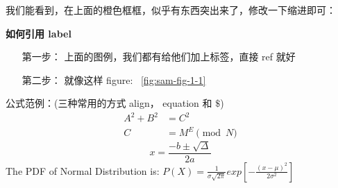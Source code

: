 \documentclass[11pt]{article}
\theoremstyle{definition}
\begin{document}
我们能看到，在上面的橙色框框，似乎有东西突出来了，修改一下缩进即可：
\begin{shaded}
\textbf{如何引用 label}
\begin{itemize}[leftmargin = 100pt]
    \item[第一步：] 上面的图例，我们都有给他们加上标签，直接 ref 就好
    \item[第二步：] 就像这样 figure: \ \ref{fig:sam-fig-1-1}
\end{itemize}
\end{shaded}
公式范例：(三种常用的方式 align， equation 和 $\$$)
\begin{align*} %
    A^2 + B^2 &= C^2 \\
    C &= M^E \pmod{N}
\end{align*}
\begin{equation}
    x = \frac{-b \pm \sqrt{\Delta}}{2a}
\end{equation}
The PDF of Normal Distribution is: $P(X) = \frac{1}{\sigma\sqrt{2\pi}} exp \left[-\frac{(x - \mu)^2}{2 \sigma^2}\right]$
\end{document}
